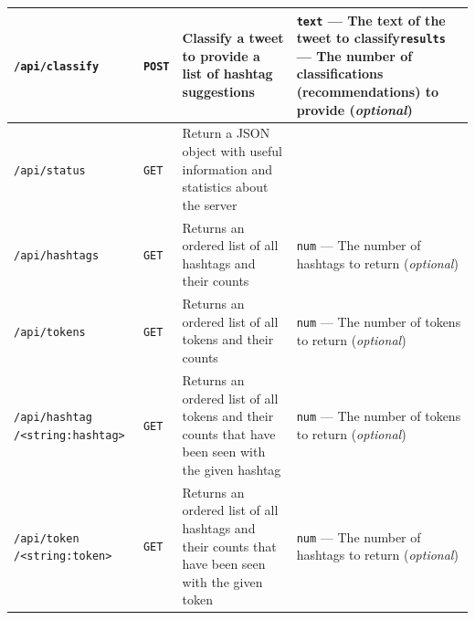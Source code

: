 \documentclass[11pt,a4paper]{report}
\begin{document}
\begin{subappendices}
\begin{center}
\begin{longtable}{|L{3cm}|C{1.5cm}|L{3.7cm}|L{3.7cm}|}
        \verb+/api/classify+ & \verb+POST+ & Classify a tweet to provide a list of hashtag suggestions & \verb+text+ --- The text of the tweet to classify\newline\verb+results+ --- The number of classifications (recommendations) to provide (\emph{optional}) \\

        \hline

        \verb+/api/status+ & \verb+GET+ & Return a JSON object with useful information and statistics about the server & \\

        \hline

        \verb+/api/hashtags+ & \verb+GET+ & Returns an ordered list of all hashtags and their counts & \verb+num+ --- The number of hashtags to return (\emph{optional}) \\

        \hline

        \verb+/api/tokens+ & \verb+GET+ & Returns an ordered list of all tokens and their counts & \verb+num+ --- The number of tokens to return (\emph{optional}) \\

        \hline

        \verb+/api/hashtag+\newline\verb+  /<string:hashtag>+ & \verb+GET+ & Returns an ordered list of all tokens and their counts that have been seen with the given hashtag & \verb+num+ --- The number of tokens to return (\emph{optional}) \\

        \hline

        \verb+/api/token+\newline\verb+  /<string:token>+ & \verb+GET+ & Returns an ordered list of all hashtags and their counts that have been seen with the given token & \verb+num+ --- The number of hashtags to return (\emph{optional})\\

    \end{longtable}
\end{center}
\pagebreak


\end{subappendices}
\end{document}
